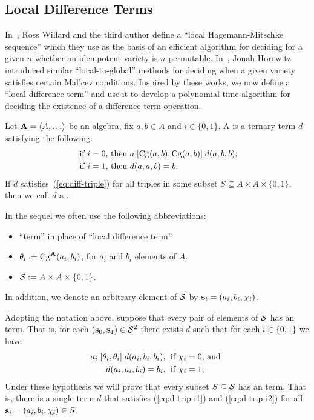 \subsection{Local Difference Terms}
\label{sec:local-diff-terms}
In~\cite{MR3239624},
Ross Willard and the third author define %
a ``local Hagemann-Mitschke sequence'' which they use as the basis of
an efficient algorithm for deciding for a given $n$ whether an idempotent
variety is $n$-permutable.
In~\cite{MR3109457}, Jonah Horowitz introduced similar 
``local-to-global'' methods for deciding when a given variety satisfies 
certain Mal'cev conditions.
Inspired by these works, we now define a ``local difference term'' and 
use it to develop a polynomial-time algorithm for deciding the existence 
of a difference term operation.

Let $\bA=\< A, \dots\>$ be an algebra, fix $a, b \in A$ and
$i \in \{0,1\}$.
A  
is a ternary term $d$ satisfying the following:
\begin{align}
\text{ if $i=0$, then } & a \mathrel{[\operatorname{Cg}(a,b), \operatorname{Cg}(a,b)]} d(a,b,b); \label{eq:diff-triple}\\
\text{ if $i=1$, then } &d(a,a,b) = b. \nonumber
\end{align}
If $d$ satisfies~(\ref{eq:diff-triple}) for all triples
in some subset $S\subseteq A \times A \times \{0,1\}$, then we call $d$
a .

\smallskip

 In the sequel we often use the following 
abbreviations:
\begin{itemize}
\item 
``\ld term'' in place of ``local difference term''
\item $\theta_i:= \operatorname{Cg}^{\mathbf{A}}(a_i, b_i)$,
for $a_i$ and $b_i$ elements of $A$.
\item $\mathcal{S} := A \times A \times \{0,1\}$. 
\end{itemize}
In addition, we denote an 
arbitrary element of $\mathcal{S}$ by $\mathbf{s}_i = (a_i, b_i, \chi_i)$.

Adopting the notation above, suppose that every pair
of elements of $\mathcal{S}$ has an \ld term.
That is, for each $(\mathbf{s}_0, \mathbf{s}_1)\in \mathcal{S}^2$ there exists
$d$ such that for each $i \in \{0,1\}$ we have
\begin{align}
  a_i \comr{\theta_i} d(a_i,b_i,b_i), & \;
  \text{ if $\chi_i=0$, and }  \label{eq:d-trip-i1}\\
  d(a_i,a_i,b_i) =b_i, & \;
  \text{ if $\chi_i=1$,}\label{eq:d-trip-i2} %
\end{align}
Under these hypothesis we will prove that every subset $S\subseteq \mathcal{S}$
has an \ld term.
That is, there is a single term $d$ that satisfies
(\ref{eq:d-trip-i1}) and (\ref{eq:d-trip-i2}) for all 
$\mathbf{s}_i = (a_i, b_i, \chi_i) \in S$.

